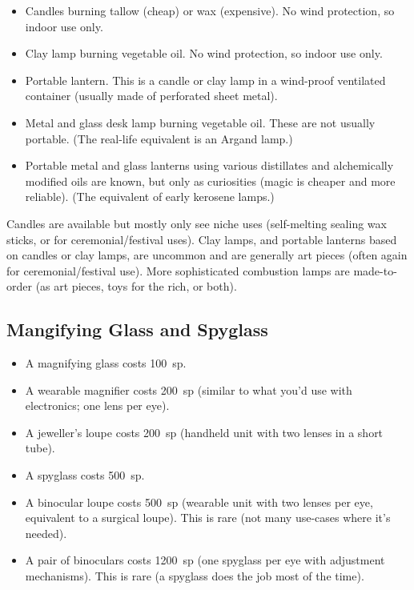 \begin{itemize}
\item Candles burning tallow (cheap) or wax (expensive). No wind protection,
so indoor use only.
\item Clay lamp burning vegetable oil. No wind protection, so indoor use only.
\item Portable lantern. This is a candle or clay lamp in a wind-proof
ventilated container (usually made of perforated sheet metal).
\item Metal and glass desk lamp burning vegetable oil. These are not usually
portable. (The real-life equivalent is an Argand lamp.)
\item Portable metal and glass lanterns using various distillates and
alchemically modified oils are known, but only as curiosities (magic is
cheaper and more reliable). (The equivalent of early kerosene lamps.)
\end{itemize}

Candles are available but mostly only see niche uses (self-melting sealing
wax sticks, or for ceremonial/festival uses). Clay lamps, and portable
lanterns based on candles or clay lamps, are uncommon and are generally art
pieces (often again for ceremonial/festival use). More sophisticated
combustion lamps are made-to-order (as art pieces, toys for the rich, or
both).
%

%
\subsection{Mangifying Glass and Spyglass}

\begin{itemize}
\item A magnifying glass costs 100~sp.
\item A wearable magnifier costs 200~sp (similar to what you'd use with
electronics; one lens per eye).
\item A jeweller's loupe costs 200~sp (handheld unit with two lenses in a
short tube).
\item A spyglass costs 500~sp.
\item A binocular loupe costs 500~sp (wearable unit with two lenses per
eye, equivalent to a surgical loupe). This is rare (not many use-cases
where it's needed).
\item A pair of binoculars costs 1200~sp (one spyglass per eye with
adjustment mechanisms). This is rare (a spyglass does the job most of the
time).
\end{itemize}


